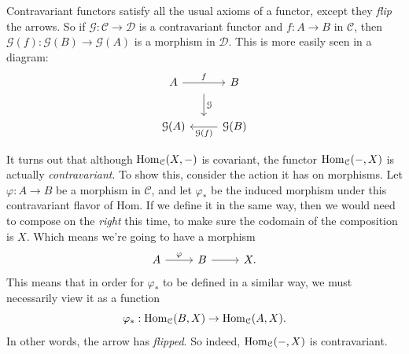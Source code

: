 Contravariant functors satisfy all the usual axioms of a functor, except they \emph{flip} the arrows. So if $\mathcal{G} : \mathcal{C}  \to \mathcal{D} $ is a contravariant functor and $f : A \to B$ in $\mathcal{C} $, then $\mathcal{G} (f): \mathcal{G} (B) \to \mathcal{G} (A)$ is a morphism in $\mathcal{D} $. This is more easily seen in a diagram:
\[\begin{tikzcd}[row sep = 2.5em, column sep = 2.5em]
	A\ar[r, "f"{name=f}]&B\\
	\mathcal{G} (A)&\mathcal{G} (B)\ar[l, "\mathcal{G} (f)"{name=gf}]
	\arrow[from=f, to=gf, "\mathcal{G} ", shorten=10pt]
\end{tikzcd}\]

It turns out that although $\operatorname{Hom}_{\mathcal{C} }(X, -) $ is covariant, the functor $\operatorname{Hom}_{\mathcal{C} }(-, X) $ is actually \emph{contravariant}. To show this, consider the action it has on morphisms. Let $\varphi : A \to B$ be a morphism in $\mathcal{C} $, and let $\varphi _*$ be the induced morphism under this contravariant flavor of Hom. If we define it in the same way, then we would need to compose on the \emph{right} this time, to make sure the codomain of the composition is $X$. Which means we're going to have a morphism
\[\begin{tikzcd}[row sep = 2.5em, column sep = 2.5em]
	A\ar[" \varphi  ", r]  & B \ar[r] &X.
\end{tikzcd}\]
This means that in order for $\varphi _*$ to be defined in a similar way, we must necessarily view it as a function
\[
	\varphi _*: \operatorname{Hom}_{\mathcal{C} }(B, X)  \to \operatorname{Hom}_{\mathcal{C} }(A, X) 
.\]
In other words, the arrow has \emph{flipped}. So indeed, $\operatorname{Hom}_{\mathcal{C} }(-, X) $ is contravariant.
